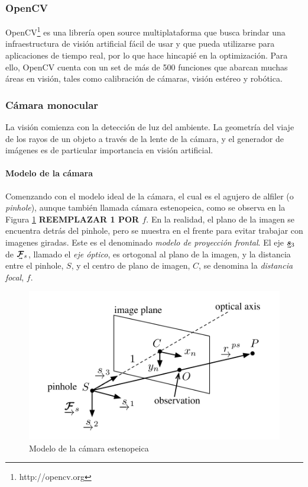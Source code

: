 \subsubsection{OpenCV}
OpenCV\footnote{http://opencv.org} es una librería open source multiplataforma que busca brindar una infraestructura de visión artificial fácil de usar y que pueda utilizarse para aplicaciones de tiempo real, por lo que hace hincapié en la optimización. Para ello, OpenCV cuenta con un set de más de 500 funciones \cite{kaehler2017} que abarcan muchas áreas en visión, tales como calibración de cámaras, visión estéreo y robótica.

\subsubsection{Cámara monocular}
La visión comienza con la detección de luz del ambiente. La geometría del viaje de los rayos de un objeto a través de la lente de la cámara, y el generador de imágenes es de particular importancia en visión artificial.


\paragraph{Modelo de la cámara}
Comenzando con el modelo ideal de la cámara, el cual es el agujero de alfiler (o \textit{pinhole}), aunque también llamada cámara estenopeica, como se observa en la Figura \ref{fig:pinholecamera} \textbf{REEMPLAZAR 1 POR $f$}. En la realidad, el plano de la imagen se encuentra detrás del pinhole, pero se muestra en el frente para evitar trabajar con imagenes giradas. Este es el denominado \textit{modelo de proyección frontal}. El eje $\undervec{\bm{s}}_3$ de $\undervec{\bm{\mathcal{F}}}_s$, llamado el \textit{eje 
óptico}, es ortogonal al plano de la imagen, y la distancia entre el pinhole, $S$, y el centro de plano de imagen, $C$,  se denomina la \textit{distancia focal}, $f$.
\begin{figure}
    \centering
    \includegraphics[width=\linewidth]{Img/PinholeCamera.png}
    \caption{Modelo de la cámara estenopeica}
    \label{fig:pinholecamera}
\end{figure}

